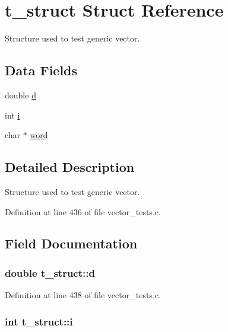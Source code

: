 \hypertarget{structt__struct}{
\section{t\_\-struct Struct Reference}
\label{structt__struct}
}


Structure used to test generic vector.  


\subsection*{Data Fields}
\begin{DoxyCompactItemize}
\item 
double \hyperlink{structt__struct_a2029e2f2da88d23bcc9fa6ba45f51bf4}{d}
\item 
int \hyperlink{structt__struct_a488184c86cae0be164cfb634882b8f7a}{i}
\item 
char $\ast$ \hyperlink{structt__struct_ad78db3e317b59f63dec93a023412619d}{word}
\end{DoxyCompactItemize}


\subsection{Detailed Description}
Structure used to test generic vector. 

Definition at line 436 of file vector\_\-tests.c.



\subsection{Field Documentation}
\hypertarget{structt__struct_a2029e2f2da88d23bcc9fa6ba45f51bf4}{
\subsubsection[{d}]{\setlength{\rightskip}{0pt plus 5cm}double {\bf t\_\-struct::d}}}
\label{structt__struct_a2029e2f2da88d23bcc9fa6ba45f51bf4}


Definition at line 438 of file vector\_\-tests.c.

\hypertarget{structt__struct_a488184c86cae0be164cfb634882b8f7a}{
\subsubsection[{i}]{\setlength{\rightskip}{0pt plus 5cm}int {\bf t\_\-struct::i}}}
\label{structt__struct_a488184c86cae0be164cfb634882b8f7a}


